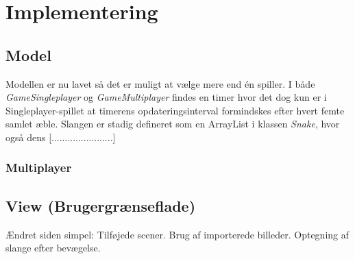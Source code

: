 
\section{Implementering}
\subsection{Model}
Modellen er nu lavet så det er muligt at vælge mere end én spiller. I både \textit{GameSingleplayer} og \textit{GameMultiplayer} findes en timer hvor det dog kun er i Singleplayer-spillet at timerens opdateringsinterval formindskes efter hvert femte samlet æble. Slangen er stadig defineret som en ArrayList i klassen \textit{Snake}, hvor også dens [.......................]

\subsubsection{Multiplayer}

\subsection{View (Brugergrænseflade)}
Ændret siden simpel: Tilføjede scener. Brug af importerede billeder. Optegning af slange efter bevægelse.


